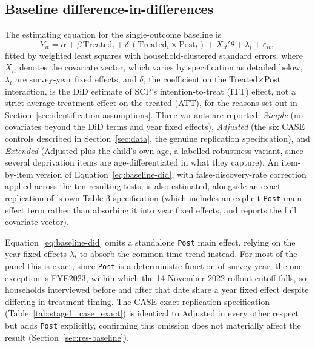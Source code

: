 \subsection{Baseline difference-in-differences}
\label{sec:baseline-did}
 
The estimating equation for the single-outcome baseline is
\begin{equation}
Y_{it} = \alpha + \beta\,\text{Treated}_{i} + \delta\,(\text{Treated}_{i} \times \text{Post}_{t}) + X_{it}'\theta + \lambda_{t} + \varepsilon_{it},
\label{eq:baseline-did}
\end{equation}
fitted by weighted least squares with household-clustered standard errors, where $X_{it}$ denotes the covariate vector, which varies by specification as detailed below, $\lambda_{t}$ are survey-year fixed effects, and $\delta$, the coefficient on the Treated$\times$Post interaction, is the DiD estimate of SCP's intention-to-treat (ITT) effect, not a strict average treatment effect on the treated (ATT), for the reasons set out in Section~\ref{sec:identification-assumptions}. Three variants are reported: \emph{Simple} (no covariates beyond the DiD terms and year fixed effects), \emph{Adjusted} (the six CASE controls described in Section~\ref{sec:data}, the genuine \citeauthor{andersen2025} replication specification), and \emph{Extended} (Adjusted plus the child's own age, a labelled robustness variant, since several deprivation items are age-differentiated in what they capture). An item-by-item version of Equation~\ref{eq:baseline-did}, with \citet{benjaminihochberg1995} false-discovery-rate correction applied across the ten resulting tests, is also estimated, alongside an exact replication of \citet{andersen2025}'s own Table 3 specification (which includes an explicit \texttt{Post} main-effect term rather than absorbing it into year fixed effects, and reports the full covariate vector).

Equation~\ref{eq:baseline-did} omits a standalone \texttt{Post} main effect, relying on the year fixed effects $\lambda_{t}$ to absorb the common time trend instead. For most of the panel this is exact, since \texttt{Post} is a deterministic function of survey year; the one exception is FYE2023, within which the 14 November 2022 rollout cutoff falls, so households interviewed before and after that date share a year fixed effect despite differing in treatment timing. The CASE exact-replication specification (Table~\ref{tab:stage1_case_exact}) is identical to Adjusted in every other respect but adds \texttt{Post} explicitly, confirming this omission does not materially affect the result (Section~\ref{sec:res-baseline}).
 
